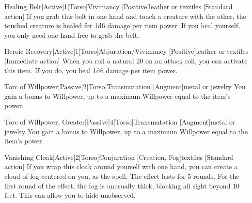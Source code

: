             \begin{magicitemdef}{Healing Belt}[Active]{1}[Torso]{Vivimancy [Positive]}{leather or textiles}
                [Standard action] If you grab this belt in one hand and touch a creature with the other, the touched creature is healed for 1d6 damage per item power.
                If you heal yourself, you only need one hand free to grab the belt.
            \end{magicitemdef}

            \begin{magicitemdef}{Heroic Recovery}[Active]{1}[Torso]{Abjuration/Vivimancy [Positive]}{leather or textiles}
                [Immediate action] When you roll a natural 20 on an attack roll, you can activate this item. If you do, you heal 1d6 damage per item power.
            \end{magicitemdef}

            \begin{magicitemdef}{Torc of Willpower}[Passive]{2}[Torso]{Transmutation [Augment]}{metal or jewelry}
                 You gain a  bonus to Willpower, up to a maximum Willpower equal to the item's power.
            \end{magicitemdef}

            \begin{magicitemdef}{Torc of Willpower, Greater}[Passive]{4}[Torso]{Transmutation [Augment]}{metal or jewelry}
                 You gain a  bonus to Willpower, up to a maximum Willpower equal to the item's power.
            \end{magicitemdef}

            \begin{magicitemdef}{Vanishing Cloak}[Active]{2}[Torso]{Conjuration [Creation, Fog]}{textiles}
                [Standard action] If you wrap this cloak around yourself with one hand, you can create a cloud of fog centered on you, as the  spell.
                The effect lasts for 5 rounds.
                For the first round of the effect, the fog is unusually thick, blocking all sight beyond 10 feet.
                This can allow you to hide unobserved.
            \end{magicitemdef}

